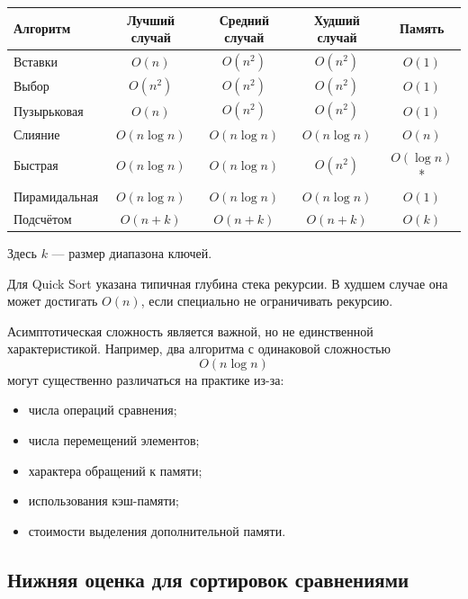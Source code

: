 \begin{center}
	\begin{tabular}{|l|c|c|c|c|}
		\hline
		Алгоритм &
		Лучший случай &
		Средний случай &
		Худший случай &
		Память \\ \hline
		
		Вставки &
		$O(n)$ &
		$O(n^2)$ &
		$O(n^2)$ &
		$O(1)$ \\ \hline
		
		Выбор &
		$O(n^2)$ &
		$O(n^2)$ &
		$O(n^2)$ &
		$O(1)$ \\ \hline
		
		Пузырьковая &
		$O(n)$ &
		$O(n^2)$ &
		$O(n^2)$ &
		$O(1)$ \\ \hline
		
		Слияние &
		$O(n\log n)$ &
		$O(n\log n)$ &
		$O(n\log n)$ &
		$O(n)$ \\ \hline
		
		Быстрая &
		$O(n\log n)$ &
		$O(n\log n)$ &
		$O(n^2)$ &
		$O(\log n)$* \\ \hline
		
		Пирамидальная &
		$O(n\log n)$ &
		$O(n\log n)$ &
		$O(n\log n)$ &
		$O(1)$ \\ \hline
		
		Подсчётом &
		$O(n+k)$ &
		$O(n+k)$ &
		$O(n+k)$ &
		$O(k)$ \\ \hline
	\end{tabular}
\end{center}

Здесь $k$ --- размер диапазона ключей.

Для Quick Sort указана типичная глубина стека рекурсии. В худшем случае
она может достигать $O(n)$, если специально не ограничивать рекурсию.

Асимптотическая сложность является важной, но не единственной характеристикой.
Например, два алгоритма с одинаковой сложностью
\[
O(n\log n)
\]
могут существенно различаться на практике из-за:
\begin{itemize}
	\item числа операций сравнения;
	\item числа перемещений элементов;
	\item характера обращений к памяти;
	\item использования кэш-памяти;
	\item стоимости выделения дополнительной памяти.
\end{itemize}


\subsection{Нижняя оценка для сортировок сравнениями}

